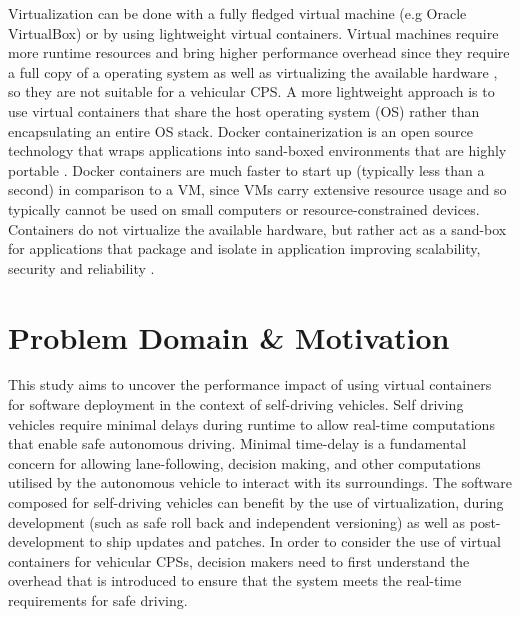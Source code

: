
Virtualization can be done with a fully fledged virtual machine (e.g Oracle VirtualBox) or by using lightweight virtual containers. Virtual machines require more runtime resources and bring higher performance overhead since they require a full copy of a operating system as well as virtualizing the available hardware \cite{anderson2015docker}, so they are not suitable for a vehicular CPS. A more lightweight approach is to use virtual containers that share the host operating system (OS) rather than encapsulating an entire OS stack. Docker containerization is an open source technology that wraps applications into sand-boxed environments that are highly portable \cite{anderson2015docker}. Docker containers are much faster to start up (typically less than a second) in comparison to a VM, since VMs carry extensive resource usage and so typically cannot be used on small computers or resource-constrained devices. Containers do not virtualize the available hardware, but rather act as a sand-box for applications that package and isolate in application improving scalability, security and reliability \cite{gonz}. 




\section{Problem Domain \& Motivation}
This study aims to uncover the performance impact of using virtual containers for software deployment in the context of self-driving vehicles. Self driving vehicles require minimal delays during runtime to allow real-time computations that enable safe autonomous driving. Minimal time-delay is a fundamental concern for allowing lane-following, decision making, and other computations utilised by the autonomous vehicle to interact with its surroundings. The software composed for self-driving vehicles can benefit by the use of virtualization, during development (such as safe roll back and independent versioning) as well as post-development to ship updates and patches. In order to consider the use of virtual containers for vehicular CPSs, decision makers need to first understand the overhead that is introduced to ensure that the system meets the real-time requirements for safe driving.

